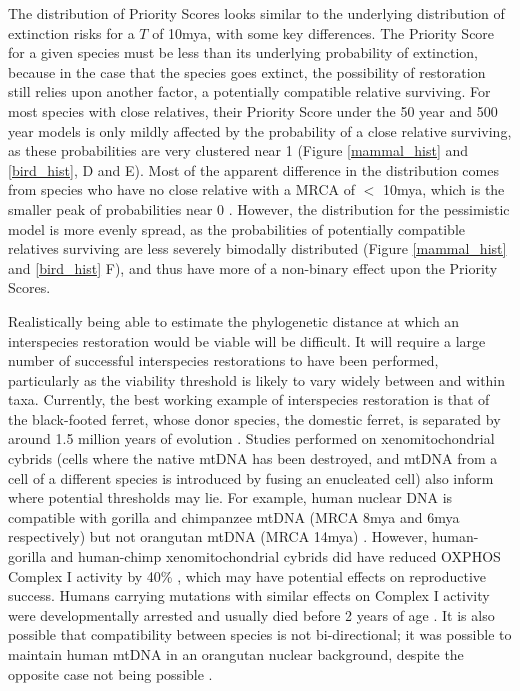 \documentclass[12pt]{article}
\begin{document}
	The distribution of Priority Scores looks similar to the underlying
	distribution of extinction risks for a $T$ of 10mya, with some
	key differences. The Priority Score for a given species must be less
	than its underlying probability of extinction, because
	in the case that the species goes extinct, the possibility of restoration
	still relies upon another factor, a potentially compatible relative
	surviving. For most species with close relatives, their Priority Score under
	the 50 year and 500 year models is only
	mildly affected by the probability of a close relative surviving, as these
	probabilities are very clustered near 1 (Figure 
	\ref{mammal_hist} and \ref{bird_hist}, D and E).
	Most of the apparent difference in the distribution
	comes from species who have no close relative with a MRCA of $<$ 10mya,
	which is the smaller peak of probabilities near 0 .
	However, the distribution for the pessimistic model is more evenly spread,
	as the probabilities of potentially compatible relatives surviving are less
	severely bimodally distributed (Figure \ref{mammal_hist} and 
	\ref{bird_hist} F), and thus have more of a  non-binary effect
	upon the Priority Scores.
	
	Realistically being able to estimate the phylogenetic distance at which
	an interspecies restoration would be viable will be difficult. It will
	require a large number of successful interspecies restorations to
	have been performed, particularly as the viability threshold
	is likely to vary widely
	between and within taxa. Currently, the best working example of interspecies
	restoration is that of the black-footed ferret, whose donor species, the
	domestic ferret, is separated by around 1.5 million years of evolution
	\citep{frittsConservationFirstCloned2022}. Studies performed on xenomitochondrial
	cybrids (cells where the native mtDNA has
	been destroyed, and mtDNA from a cell of a different species is introduced
	by fusing an enucleated cell) also inform where potential thresholds
	may lie.
	For example, human nuclear DNA
	is compatible with gorilla and chimpanzee mtDNA (MRCA 8mya and 6mya respectively)
	but not orangutan mtDNA (MRCA 14mya)
	\citep{kenyonExpandingFunctionalHuman1997}. However, human-gorilla and
	human-chimp xenomitochondrial cybrids did have reduced
	OXPHOS Complex I activity by 40\%
	\citep{barrientosHumanXenomitochondrialCybrids1998}, which may have potential effects on reproductive success. Humans carrying mutations with similar effects on Complex
	I activity were developmentally arrested and usually died before 2 years of
	age \citep{gershoniMitochondrialBioenergeticsMajor2009}. It is also possible
	that compatibility between species is not bi-directional; it was possible to
	maintain human mtDNA in an orangutan nuclear background, despite the opposite
	case not being possible \citep{bayona-bafaluyFastAdaptiveCoevolution2005}.
	
\end{document}
